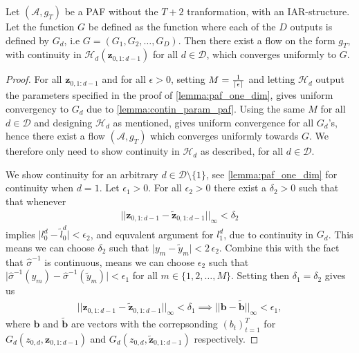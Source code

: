 \begin{lemma}\label{lemma:contin_param_paf}
    Let \((\mathcal{A}, g_T)\) be a PAF without the \(T+2\) tranformation, with an IAR-structure. Let the function \(G\) be defined as the function
    where each of the \(D\) outputs is defined by \(G_d\), i.e \(G = (G_1, G_2, \dots, G_D)\). Then there exist a flow on the form \(g_T\), with
    continuity in \(\mathcal{H}_d(\bm z_{0,1:d-1})\) for all \(d \in \mathcal{D}\), which 
    converges uniformly to \(G\). 
\end{lemma}
\begin{proof}
    For all \(\bm z_{0,1:d-1}\) and for all \(\epsilon > 0\), setting \(M = \frac{1}{\lceil\epsilon\rceil}\) and 
    letting \(\mathcal{H}_d\) output the parameters specified in the proof of 
    \cref{lemma:paf_one_dim},  gives uniform convergency to \(G_d\) due to \cref{lemma:contin_param_paf}.
    Using the same \(M\) for all \(d \in \mathcal{D}\) and designing \(\mathcal{H}_d\) as mentioned, gives uniform convergence for all \(G_d\)'s, hence
    there exist a flow \((\mathcal{A}, g_T)\) which converges uniformly towards \(G\). We therefore only need to show continuity in \(\mathcal{H}_d\) as 
    described, for all \(d \in \mathcal{D}\).

    We show continuity for an arbitrary \(d \in \mathcal{D}\setminus \{1\}\), see \cref{lemma:paf_one_dim} for continuity when \(d=1\). 
    Let \(\epsilon_1 > 0\). For all \(\epsilon_2 > 0\) there exist a \(\delta_2 > 0\) such that that whenever
    \begin{align*}
        \lvert\lvert \bm z_{0,1:d-1} - \tilde{\bm z}_{0,1:d-1}\rvert\rvert_{\infty} < \delta_2
    \end{align*}
    implies \(\lvert l_0^d - \tilde{l}_0^d\rvert < \epsilon_2\), and equvalent argument for \(l_1^d\),
    due to continuity in \(G_d\). This means we can choose \(\delta_2\) such that \(\lvert y_m - \tilde y_m \rvert < 2 \,\epsilon_2\). Combine this with the fact that
    \(\hat{\sigma}^{-1}\) is continuous, means we can choose \(\epsilon_2\) such that 
    \(\lvert \hat{\sigma}^{-1}(y_m) - \hat{\sigma}^{-1}(\tilde y_m)\rvert < \epsilon_1\) for all \(m \in \{1,2,\dots,M\}\). 
    Setting then \(\delta_1 = \delta_2\) gives us
    \begin{align*}
        \lvert\lvert \bm z_{0,1:d-1} - \tilde{\bm z}_{0,1:d-1}\rvert\rvert_{\infty} < \delta_1
        \implies \lvert\lvert \bm b - \tilde{\bm b}\rvert\rvert_{\infty} < \epsilon_1,
    \end{align*}
    where \(\bm b\) and \(\tilde{\bm b}\) are vectors with the correpsonding \((b_t)_{t=1}^T\) for \(G_d(z_{0,d}, \bm z_{0,1:d-1})\) and 
    \(G_d(z_{0,d}, \tilde{\bm z}_{0,1:d-1})\) respectively. 


\end{proof}
